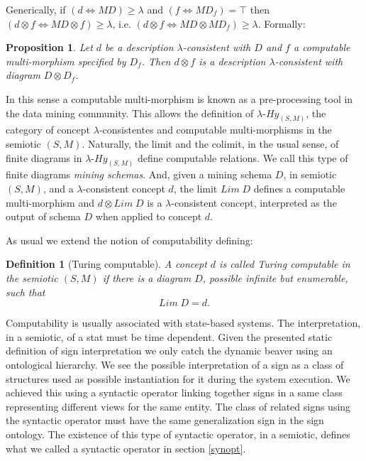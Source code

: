 \documentclass[oribibl]{llncs}
\newtheorem{prop}{Proposition}
\newtheorem{defn}{Definition}
\begin{document}
Generically, if $(d\Leftrightarrow MD)\geq \lambda$ and $(f\Leftrightarrow MD_f)=\top$ then $(d\otimes f \Leftrightarrow MD\otimes f)\geq \lambda$, i.e. $(d\otimes f \Leftrightarrow MD\otimes MD_f)\geq \lambda$. Formally:
\begin{prop}
 Let $d$ be a description $\lambda$-consistent with $D$ and $f$ a computable multi-morphism specified by $D_f$. Then $d\otimes f$ is a description  $\lambda$-consistent with diagram $D\otimes D_f$.
\end{prop}

In this sense a computable multi-morphism is known as a pre-processing tool in the data mining community. This allows the definition of $\lambda$-$Hy_{(S,M)}$, the category of concept $\lambda$-consistentes and  computable multi-morphisms in the semiotic $(S,M)$. Naturally, the limit and the colimit, in the usual sense, of finite diagrams in $\lambda$-$Hy_{(S,M)}$ define computable relations. We call this type of finite diagrams \emph{mining schemas}. And, given a mining schema $D$, in semiotic $(S,M)$, and a $\lambda$-consistent concept $d$, the limit $Lim\;D$ defines a computable multi-morphism and $d\otimes Lim\;D$ is a $\lambda$-consistent concept, interpreted as the output of schema $D$ when applied to concept $d$.

As usual we extend the notion of computability defining:
\begin{defn}[Turing computable]
A concept $d$ is called \emph{Turing computable} in the semiotic $(S,M)$ if there is a diagram $D$, possible infinite but enumerable, such that \[Lim\;D=d.\]
\end{defn}

Computability is usually associated with state-based systems. The interpretation, in a semiotic, of a stat must be time dependent. Given the presented static definition of sign interpretation we only catch the dynamic beaver using an ontological hierarchy. We see the possible interpretation of a sign as a class of structures used as possible instantiation for it during the system execution. We achieved this using a syntactic operator linking together signs in a same class representing different views for the same entity. The class of related signs using the syntactic operator must have the same generalization sign in the sign ontology. The existence of this type of syntactic operator, in a semiotic, defines what we called a syntactic operator in section \ref{synopt}.
\end{document}
